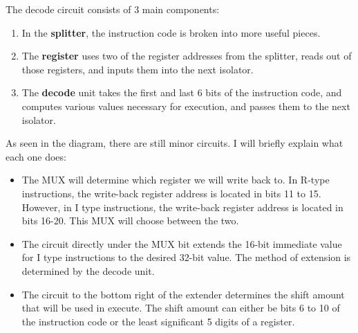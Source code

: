 \documentclass{article}
\begin{document}
\newpage
The decode circuit consists of 3 main components: 
\begin{enumerate}
\item
In the \textbf{splitter}, the instruction code is broken into more useful pieces.

\item
The \textbf{register} uses two of the register addresses from the splitter, reads out of those registers, and inputs them into the next isolator.

\item
The \textbf{decode} unit takes the first and last 6 bits of the instruction code, and computes various values necessary for execution, and passes them to the next isolator. 
\end{enumerate}
As seen in the diagram, there are still minor circuits. I will briefly explain what each one does:
\begin{itemize}
\item
The MUX will determine which register we will write back to. In R-type instructions, the write-back register address is located in bits 11 to 15. However, in I type instructions, the write-back register address is located in bits 16-20. This MUX will choose between the two.

\item
The circuit directly under the MUX bit extends the 16-bit immediate value for I type instructions to the desired 32-bit value. The method of extension is determined by the decode unit.

\item
The circuit to the bottom right of the extender determines the shift amount that will be used in execute. The shift amount can either be bits 6 to 10 of the instruction code or the least significant 5 digits of a register. 
\end{itemize}
\end{document}
